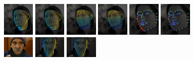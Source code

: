 \begin{figure}[ht]
\includegraphics[width=0.13775\textwidth]{resources/Human_Poses/results/3/HGT}
\includegraphics[width=0.13775\textwidth]{resources/Human_Poses/results/3/Hreg}
\includegraphics[width=0.13775\textwidth]{resources/Human_Poses/results/3/VGT}
\includegraphics[width=0.13775\textwidth]{resources/Human_Poses/results/3/Vreg}
\includegraphics[width=0.13775\textwidth]{resources/Human_Poses/results/3/Landmarks_alp}
\includegraphics[width=0.13775\textwidth]{resources/Human_Poses/results/3/Landmarks_MDM}\\
%
\includegraphics[width=0.13775\textwidth]{resources/Human_Poses/results/7/I}
\includegraphics[width=0.13775\textwidth]{resources/Human_Poses/results/7/HGT}
\includegraphics[width=0.13775\textwidth]{resources/Human_Poses/results/7/Hreg}

\end{figure}
